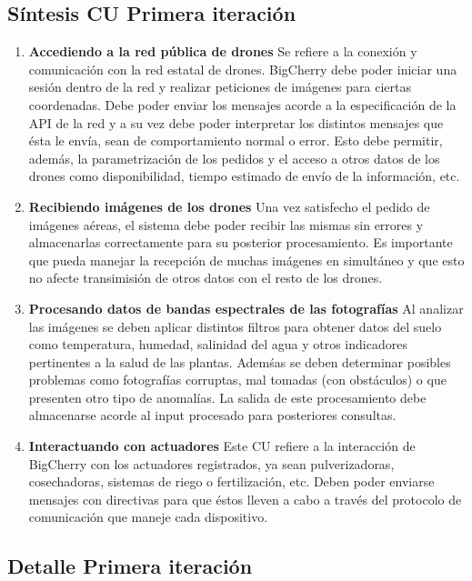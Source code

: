 \clearpage

\subsection{Síntesis CU Primera iteración}
		
\begin{enumerate}
	\item \textbf{Accediendo a la red pública de drones}
	Se refiere a la conexión y comunicación con la red estatal de drones. BigCherry debe poder iniciar una sesión dentro de la red y realizar peticiones de imágenes para ciertas coordenadas. Debe poder enviar los mensajes acorde a la especificación de la API de la red y a su vez debe poder interpretar los distintos mensajes que ésta le envía, sean de comportamiento normal o error. Esto debe permitir, además, la parametrización de los pedidos y el acceso a otros datos de los drones como disponibilidad, tiempo estimado de envío de la información, etc.

	\item \textbf{Recibiendo imágenes de los drones}
	Una vez satisfecho el pedido de imágenes aéreas, el sistema debe poder recibir las mismas sin errores y almacenarlas correctamente para su posterior procesamiento. Es importante que pueda manejar la recepción de muchas imágenes en simultáneo y que esto no afecte transimisión de otros datos con el resto de los drones.

	\item \textbf{Procesando datos de bandas espectrales de las fotografías}
	Al analizar las imágenes se deben aplicar distintos filtros para obtener datos del suelo como temperatura, humedad, salinidad del agua y otros indicadores pertinentes a la salud de las plantas. Ademśas se deben determinar posibles problemas como fotografías corruptas, mal tomadas (con obstáculos) o que presenten otro tipo de anomalías. La salida de este procesamiento debe almacenarse acorde al input procesado para posteriores consultas.

	\item \textbf{Interactuando con actuadores} 
	Este CU refiere a la interacción de BigCherry con los actuadores registrados, ya sean pulverizadoras, cosechadoras, sistemas de riego o fertilización, etc. Deben poder enviarse mensajes con directivas para que éstos lleven a cabo a través del protocolo de comunicación que maneje cada dispositivo.
\end{enumerate}

\subsection{Detalle Primera iteración}

